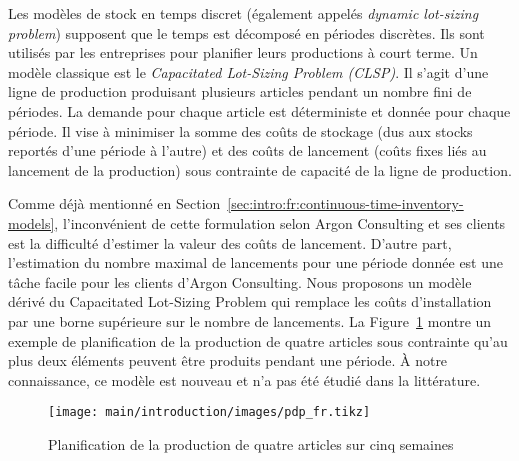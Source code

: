 Les modèles de stock en temps discret (également appelés \emph{dynamic lot-sizing problem}) supposent que le temps est décomposé en périodes discrètes.
Ils sont utilisés par les entreprises pour planifier leurs productions à court terme.
Un modèle classique est le \emph{Capacitated Lot-Sizing Problem (CLSP)}.
Il s'agit d'une ligne de production produisant plusieurs articles pendant un nombre fini de périodes.
La demande pour chaque article est déterministe et donnée pour chaque période.
Il vise à minimiser la somme des coûts de stockage (dus aux stocks reportés d'une période à l'autre) et des coûts de lancement (coûts fixes liés au lancement de la production) sous contrainte de capacité de la ligne de production.


Comme déjà mentionné en Section~\ref{sec:intro:fr:continuous-time-inventory-models}, l'inconvénient de cette formulation selon Argon Consulting et ses clients est la difficulté d'estimer la valeur des coûts de lancement.
D'autre part, l'estimation du nombre maximal de lancements pour une période donnée est une tâche facile pour les clients d'Argon Consulting.
Nous proposons un modèle dérivé du Capacitated Lot-Sizing Problem qui remplace les coûts d'installation par une borne supérieure sur le nombre de lancements.
La Figure~\ref{fig:intro:fr:pdp} montre un exemple de planification de la production de quatre articles sous contrainte qu'au plus deux éléments peuvent être produits pendant une période.
\`A notre connaissance, ce modèle est nouveau et n'a pas été étudié dans la littérature.


\begin{figure}[!ht]
  \centering
  \texttt{[image: main/introduction/images/pdp\_fr.tikz]}
  \caption{Planification de la production de quatre articles sur cinq semaines}
  \label{fig:intro:fr:pdp}
\end{figure}


